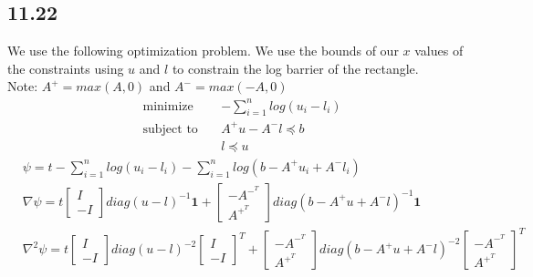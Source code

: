 \documentclass[12pt]{article}
\begin{document}
\subsection*{11.22}
We use the following optimization problem. We use  the bounds of our $x$ values of the constraints using $u$ and $l$ to constrain the log barrier of the rectangle.\\
Note: $A^+ = max(A, 0)$ and $A^- = max(-A, 0)$
\begin{equation*}
\begin{aligned}
& \underset{}{\text{minimize}}
& & -\sum_{i=1}^{n}log(u_i-l_i)\\
& \text{subject to}\
& & A^+u - A^-l \preceq b\\ 
&&& l \preceq u
\end{aligned}
\end{equation*}
\begin{equation*}
\begin{aligned}
& \psi = t-\sum_{i=1}^{n}log(u_i-l_i) - \sum_{i=1}^{n}log(b - A^+u_i + A^-l_i)\\
& \nabla \psi = t\begin{bmatrix} I\\ -I\end{bmatrix}diag(u-l)^{-1}\textbf{1} + \begin{bmatrix} -A^-^T \\ A^+^T\end{bmatrix}diag(b-A^+u+A^-l)^{-1}\textbf{1}\\
& \nabla^2 \psi = t\begin{bmatrix} I\\ -I\end{bmatrix}diag(u-l)^{-2}\begin{bmatrix} I\\ -I\end{bmatrix}^T + \begin{bmatrix} -A^-^T \\ A^+^T\end{bmatrix}diag(b-A^+u+A^-l)^{-2} \begin{bmatrix} -A^-^T\\ A^+^T\end{bmatrix}^T\\
\end{aligned}
\end{equation*}
 
\end{document}
